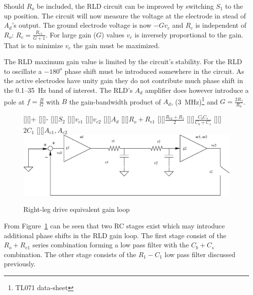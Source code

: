 Should $R_o$ be included, the RLD circuit can be improved by switching
$S_1$ to the up position. The circuit will now measure the voltage at
the electrode in stead of $A_d$'s output. The ground electrode voltage
is now $-Gv_c$ and $R_c$ is independent of $R_o$: $R_c =
\frac{R_{e1}}{G + 1}$. For large gain ($G$) values $v_c$ is inversely
proportional to the gain. That is to minimize $v_c$ the gain must be
maximized.

The RLD maximum gain value is limited by the circuit's stability. For
the RLD to oscillate a $-180^o$ phase shift must be introduced
somewhere in the circuit. As the active electrodes have unity gain
they do not contribute much phase shift in the 0.1--35~Hz band of
interest. The RLD's $A_d$ amplifier does however introduce a pole at
$f = \frac{B}{G}$ with $B$ the gain-bandwidth product of $A_d$,
(3~MHz)\footnote{TL071 data-sheet} and $G = \frac{2R_f}{R_a}$.



\begin{figure}[htbp]
\begin{center}
	\psfrag{+}[][]{+}
	\psfrag{-}[][]{-}  
	[][]{$S_2$} 
	[][]{$v_{c1}$}
	[][]{$v_{c2}$}  
	[][]{$A_d$} 
	[][]{$R_o + R_{e1}$}
	[][]{$\frac{R_{e2} + R_1}{2}$}
	[][]{$\frac{C_bC_s}{C_b + C_s}$}
	[][]{$2C_1$}    
	[][]{$A_{e1}, A_{e2}$} 
	\includegraphics[width=\textwidth]{rld-gain.eps}
	\caption{Right-leg drive equivalent gain loop}
	\label{fig:rld-gain} 
\end{center}
\end{figure}

From Figure~\ref{fig:rld-gain} can be seen that two RC stages exist
which may introduce additional phase shifts in the RLD gain loop. The
first stage consist of the $R_o + R_{e1}$ series combination forming a
low pass filter with the $C_b + C_s$ combination. The other stage
consists of the $R_1 - C_1$ low pass filter discussed previously.

